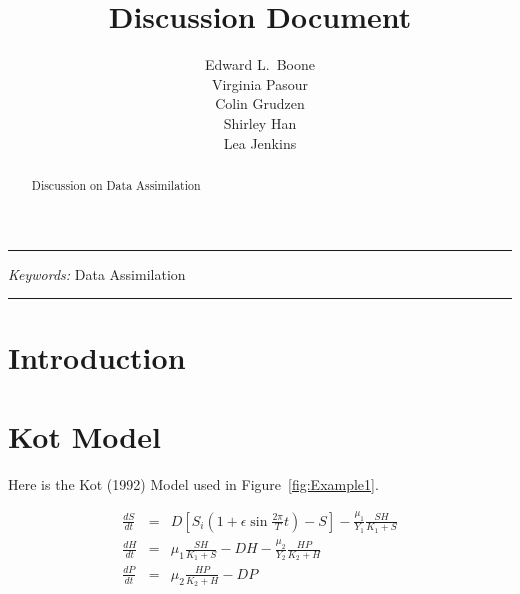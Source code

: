 \documentclass[11pt,twoside]{article}
\numberwithin{equation}{section}
\begin{document}
\title{\large \textbf{Discussion Document}}
\author{
\normalsize Edward L.~Boone\\ 
\normalsize Virginia Pasour \\
\normalsize Colin Grudzen \\
\normalsize Shirley Han \\
\normalsize Lea Jenkins \\
}
\maketitle
\vspace{0.1in}

\hrule
\begin{abstract}
Discussion on Data Assimilation
\end{abstract}
{\em Keywords:} Data Assimilation 
\vspace{0.1in}
\hrule

\section{Introduction}
\label{sect-intro}

\section{Kot Model}
Here is the Kot (1992) Model used in Figure~\ref{fig:Example1}.

\begin{eqnarray*}
  \frac{dS}{dt} &=& D \left[ S_i \left( 1 + \epsilon \sin \frac{2 \pi}{T} t \right) - S \right] - \frac{\mu_1}{Y_1} \frac{SH}{K_1 + S} \\
   \frac{dH}{dt} &=&  \mu_1 \frac{SH}{K_1 + S} - DH -  \frac{\mu_2}{Y_2} \frac{HP}{K_2 + H}  \\
   \frac{dP}{dt} &=&  \mu_2 \frac{HP}{K_2 + H} - DP \\
\end{eqnarray*}
\end{document}
